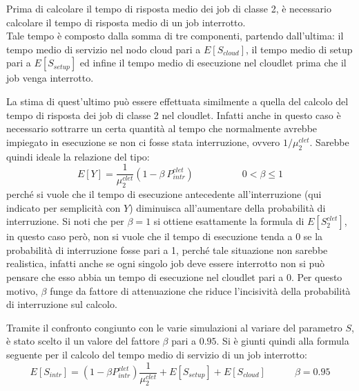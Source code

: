 Prima di calcolare il tempo di risposta medio dei job di classe 2, è necessario
calcolare il tempo di risposta medio di un job interrotto.\\
Tale tempo è composto dalla somma di tre componenti, partendo dall'ultima: il
tempo medio di servizio nel nodo cloud pari a $E[S_{cloud}]$, il tempo medio di
setup pari a $E[S_{setup}]$ ed infine il tempo medio di esecuzione nel cloudlet
prima che il job venga interrotto.

La stima di quest'ultimo può essere effettuata similmente a quella del calcolo
del tempo di risposta dei job di classe 2 nel cloudlet. Infatti anche in questo
caso è necessario sottrarre un certa quantità al tempo che normalmente avrebbe
impiegato in esecuzione se non ci fosse stata interruzione, ovvero
$1/\mu_2^{clet}$. Sarebbe quindi ideale la relazione del tipo:
\begin{displaymath}
E[Y] = \frac{1}{\mu_2^{clet}}(1 - \beta \ P_{intr}^{clet})
\qquad\quad\qquad 0 < \beta \leq 1
\end{displaymath}
perché si vuole che il tempo di esecuzione antecedente all'interruzione (qui
indicato per semplicità con $Y$) diminuisca all'aumentare della probabilità di
interruzione. Si noti che per $\beta = 1$ si ottiene esattamente la formula di
$E[S_2^{clet}]$, in questo caso però, non si vuole che il tempo di esecuzione
tenda a 0 se la probabilità di interruzione fosse pari a 1, perché tale
situazione non sarebbe realistica, infatti anche se ogni singolo job deve essere
interrotto non si può pensare che esso abbia un tempo di esecuzione nel cloudlet
pari a 0. Per questo motivo, $\beta$ funge da fattore di attenuazione che riduce
l'incisività della probabilità di interruzione sul calcolo.

Tramite il confronto congiunto con le varie simulazioni al variare del parametro
$S$, è stato scelto il un valore del fattore $\beta$ pari a $0.95$. Si è giunti
quindi alla formula seguente per il calcolo del tempo medio di servizio di un
job interrotto:
\begin{equation}
E[S_{intr}] = 
(1 - \beta P_{intr}^{clet}) \frac{1}{\mu_2^{clet}} + E[S_{setup}] + E[S_{cloud}]
\qquad\quad \beta = 0.95
\end{equation}

